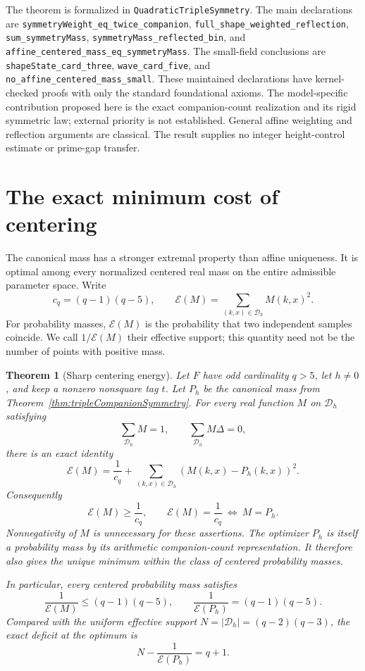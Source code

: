 \documentclass[11pt]{article}
\newtheorem{theorem}{Theorem}[section]
\begin{document}
The theorem is formalized in \texttt{QuadraticTripleSymmetry}.
The main declarations are
\texttt{symmetryWeight\_eq\_twice\_companion},
\texttt{full\_shape\_weighted\_reflection},
\texttt{sum\_symmetryMass},
\texttt{symmetryMass\_reflected\_bin}, and
\texttt{affine\_centered\_mass\_eq\_symmetryMass}.
The small-field conclusions are
\texttt{shapeState\_card\_three},
\texttt{wave\_card\_five}, and
\texttt{no\_affine\_centered\_mass\_small}.
These maintained declarations have kernel-checked proofs with only the
standard foundational axioms. The model-specific contribution proposed
here is the exact companion-count realization and its rigid symmetric
law; external priority is not established. General affine weighting and
reflection arguments are classical. The result supplies no integer
height-control estimate or prime-gap transfer.

\section{The exact minimum cost of centering}

The canonical mass has a stronger extremal property than affine
uniqueness. It is optimal among every normalized centered real mass on
the entire admissible parameter space. Write
\[
 c_q=(q-1)(q-5),\qquad
 \mathcal E(M)=\sum_{(k,x)\in\mathcal D_h}M(k,x)^2.
\]
For probability masses, \(\mathcal E(M)\) is the probability that two
independent samples coincide. We call \(1/\mathcal E(M)\) their
effective support; this quantity need not be the number of points
with positive mass.

\begin{theorem}[Sharp centering energy]\label{thm:tripleCenteringMinimum}
Let \(F\) have odd cardinality \(q>5\), let \(h\ne0\), and keep a
nonzero nonsquare tag \(t\). Let \(P_h\) be the canonical mass from
Theorem~\ref{thm:tripleCompanionSymmetry}. For every real function
\(M\) on \(\mathcal D_h\) satisfying
\[
 \sum_{\mathcal D_h}M=1,\qquad
 \sum_{\mathcal D_h}M\Delta=0,
\]
there is an exact identity
\[
 \boxed{\quad
 \mathcal E(M)=\frac1{c_q}
       +\sum_{(k,x)\in\mathcal D_h}(M(k,x)-P_h(k,x))^2.
 \quad} \tag{CE}
\]
Consequently
\[
 \mathcal E(M)\ge\frac1{c_q},
 \qquad
 \mathcal E(M)=\frac1{c_q}\ \Longleftrightarrow\ M=P_h.
 \tag{CM}
\]
Nonnegativity of \(M\) is unnecessary for these assertions.
The optimizer \(P_h\) is itself a probability mass by its arithmetic
companion-count representation. It therefore also gives the unique
minimum within the class of centered probability masses.

In particular, every centered probability mass satisfies
\[
 \frac1{\mathcal E(M)}\le(q-1)(q-5),
 \qquad
 \frac1{\mathcal E(P_h)}=(q-1)(q-5).
 \tag{ES}
\]
Compared with the uniform effective support
\(N=|\mathcal D_h|=(q-2)(q-3)\), the exact deficit at the optimum is
\[
 N-\frac1{\mathcal E(P_h)}=q+1. \tag{EC}
\]
\end{theorem}
\end{document}
